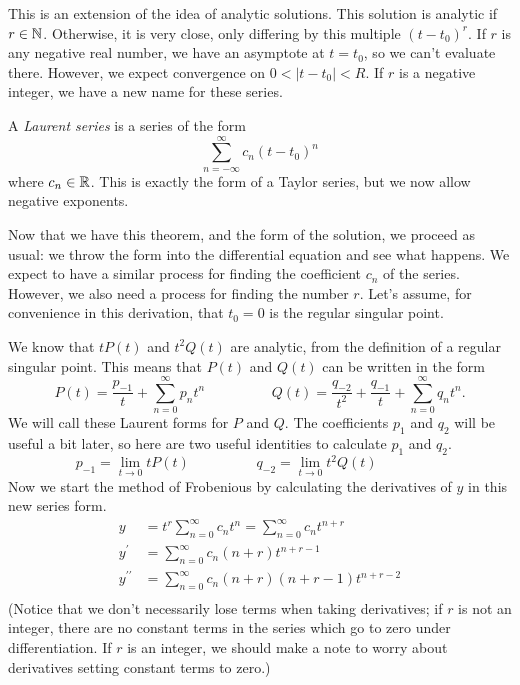 \documentclass[fleqn,letterpaper]{report}
\begin{document}
This is an extension of the idea of analytic solutions. This
solution is analytic if $r \in \mathbb{N}$. Otherwise, it is very
close, only differing by this multiple $(t-t_0)^r$. If $r$ is
any negative real number, we have an asymptote at $t=t_0$, so
we can't evaluate there. However, we expect convergence on $0
< |t-t_0| < R$.  If $r$ is a negative integer, we have a new
name for these series.

\begin{defn}
A \emph{Laurent series} is a series of the form
\begin{equation*}
\sum_{n=-\infty}^\infty c_n (t-t_0)^n
\end{equation*}
where $c_n \in \mathbb{R}$. This is exactly the form of a Taylor
series, but we now allow negative exponents. 
\end{defn}

Now that we have this theorem, and the form of the solution,
we proceed as usual: we throw the form into the differential
equation and see what happens. We expect to have a similar
process for finding the coefficient $c_n$ of the series.
However, we also need a process for finding the number $r$.
Let's assume, for convenience in this derivation, that $t_0 =
0$ is the regular singular point. 

We know that $tP(t)$ and $t^2 Q(t)$ are analytic, from the
definition of a regular singular point. This means that
$P(t)$ and $Q(t)$ can be written in the form
\begin{equation*}
P(t) = \frac{p_{-1}}{t} + \sum_{n=0}^\infty p_n t^n
\hspace{2cm}
Q(t) = \frac{q_{-2}}{t^2} + \frac{q_{-1}}{t} +
\sum_{n=0}^\infty q_n t^n.
\end{equation*}
We will call these Laurent forms for $P$ and $Q$. The
coefficients $p_1$ and $q_2$ will be useful a bit later, so
here are two useful identities to calculate $p_1$ and $q_2$.
\begin{equation*}
p_{-1} = \lim_{t \rightarrow 0 } t P(t) \hspace{2cm}
q_{-2} = \lim_{t \rightarrow 0 } t^2 Q(t) \hspace{2cm}
\end{equation*}
Now we start the method of Frobenious by calculating the
derivatives of $y$ in this new series form.
\begin{align*}
y & = t^r \sum_{n=0}^\infty c_n t^n = \sum_{n=0}^\infty c_n
t^{n+r} \\
y^\prime & = \sum_{n=0}^\infty c_n (n+r) t^{n+r-1} \\
y^{\prime \prime} & = \sum_{n=0}^\infty c_n (n+r) (n+r-1) t^{n+r-2} \\
\end{align*}
(Notice that we don't necessarily lose terms when taking
derivatives; if $r$
is not an integer, there are no constant terms in the series
which go to zero under differentiation. If $r$ is an integer,
we should make a note to worry about derivatives setting
constant terms to zero.)
\end{document}
